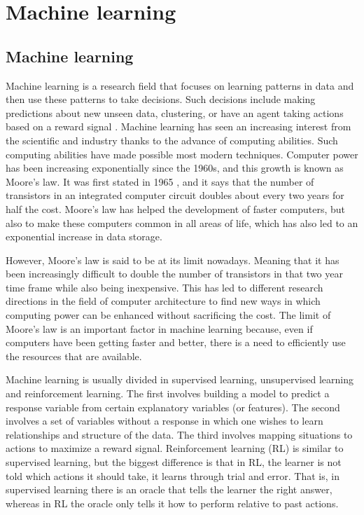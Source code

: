 
\chapter{Machine learning}
\label{ch:machine_learning}

\section{Machine learning}

Machine learning is a research field that focuses on learning patterns in data and then use these patterns to take decisions. Such decisions include making predictions about new unseen data, clustering, or have an agent taking actions based on a reward signal \cite{murphy2012machine} \cite{sutton1998reinforcement}.
Machine learning has seen an increasing interest from the scientific and industry thanks to the advance of computing abilities. Such computing abilities have made possible most modern techniques. Computer power has been increasing exponentially since the 1960s, and this growth is known as Moore's law. It was first stated in 1965 \cite{moore2006cramming} \cite{moore1975progress}, and it says that the number of transistors in an integrated computer circuit doubles about every two years for half the cost. Moore's law has helped the development of faster computers, but also to make these computers common in all areas of life, which has also led to an exponential increase in data storage.

However, Moore's law is said to be at its limit nowadays. Meaning that it has been increasingly difficult to double the number of transistors in that two year time frame while also being inexpensive. This has led to different research directions in the field of computer architecture to find new ways in which computing power can be enhanced without sacrificing the cost. The limit of Moore's law is an important factor in machine learning because, even if computers have been getting faster and better, there is a need to efficiently use the resources that are available.

Machine learning is usually divided in supervised learning, unsupervised learning and reinforcement learning. The first involves building a model to predict a response variable from certain explanatory variables (or features). The second involves a set of variables without a response in which one wishes to learn relationships and structure of the data. The third involves mapping situations to actions to maximize a reward signal. Reinforcement learning (RL) is similar to supervised learning, but the biggest difference is that in RL, the learner is not told which actions it should take, it learns through trial and error. That is, in supervised learning there is an oracle that tells the learner the right answer, whereas in RL the oracle only tells it how to perform relative to past actions.

